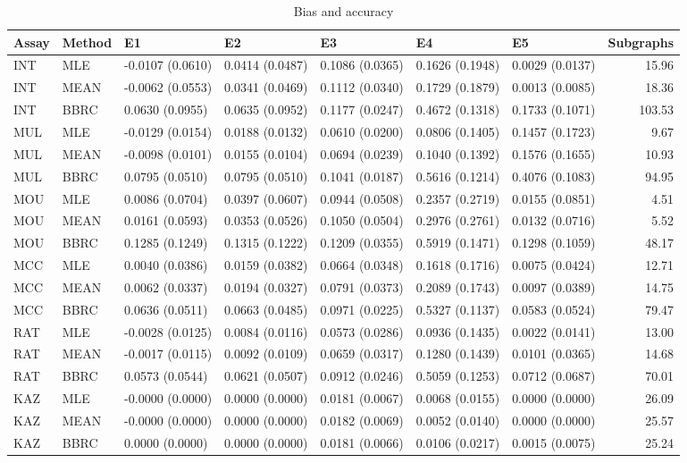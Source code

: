 \begin{table*}[t]
\begin{center}
  \begin{tabular}{lllllllr}
  \hline
 Assay & Method & E1 & E2 & E3 & E4 & E5 & Subgraphs \\ 
  \hline
  INT & MLE & -0.0107 (0.0610) & 0.0414 (0.0487) & 0.1086 (0.0365) & 0.1626 (0.1948) & 0.0029 (0.0137) & 15.96 \\ 
  INT & MEAN & -0.0062 (0.0553) & 0.0341 (0.0469) & 0.1112 (0.0340) & 0.1729 (0.1879) & 0.0013 (0.0085)& 18.36 \\ 
  INT & BBRC & 0.0630 (0.0955) & 0.0635 (0.0952) & 0.1177 (0.0247) & 0.4672 (0.1318) & 0.1733 (0.1071) & 103.53 \\ 
  MUL & MLE & -0.0129 (0.0154) & 0.0188 (0.0132) & 0.0610 (0.0200) & 0.0806 (0.1405) & 0.1457 (0.1723) & 9.67 \\ 
  MUL & MEAN & -0.0098 (0.0101) & 0.0155 (0.0104) & 0.0694 (0.0239) & 0.1040 (0.1392) & 0.1576 (0.1655)& 10.93 \\ 
  MUL & BBRC & 0.0795 (0.0510) & 0.0795 (0.0510) & 0.1041 (0.0187) & 0.5616 (0.1214) & 0.4076 (0.1083) & 94.95 \\ 
  MOU & MLE & 0.0086 (0.0704) & 0.0397 (0.0607) & 0.0944 (0.0508)  & 0.2357 (0.2719) & 0.0155 (0.0851) & 4.51 \\ 
  MOU & MEAN & 0.0161 (0.0593) & 0.0353 (0.0526) & 0.1050 (0.0504) & 0.2976 (0.2761) & 0.0132 (0.0716) & 5.52 \\ 
  MOU & BBRC & 0.1285 (0.1249) & 0.1315 (0.1222) & 0.1209 (0.0355) & 0.5919 (0.1471) & 0.1298 (0.1059) & 48.17 \\ 
  MCC & MLE & 0.0040 (0.0386) & 0.0159 (0.0382) & 0.0664 (0.0348)  & 0.1618 (0.1716) & 0.0075 (0.0424) & 12.71 \\ 
  MCC & MEAN & 0.0062 (0.0337) & 0.0194 (0.0327) & 0.0791 (0.0373) & 0.2089 (0.1743) & 0.0097 (0.0389) & 14.75 \\ 
  MCC & BBRC & 0.0636 (0.0511) & 0.0663 (0.0485) & 0.0971 (0.0225) & 0.5327 (0.1137) & 0.0583 (0.0524) & 79.47 \\ 
  RAT & MLE & -0.0028 (0.0125) & 0.0084 (0.0116) & 0.0573 (0.0286) & 0.0936 (0.1435) & 0.0022 (0.0141) & 13.00 \\ 
  RAT & MEAN & -0.0017 (0.0115) & 0.0092 (0.0109) & 0.0659 (0.0317) & 0.1280 (0.1439) & 0.0101 (0.0365)& 14.68 \\ 
  RAT & BBRC & 0.0573 (0.0544) & 0.0621 (0.0507) & 0.0912 (0.0246) & 0.5059 (0.1253) & 0.0712 (0.0687) & 70.01 \\ 
  KAZ & MLE & -0.0000 (0.0000) & 0.0000 (0.0000) & 0.0181 (0.0067) & 0.0068 (0.0155) & 0.0000 (0.0000) & 26.09 \\ 
  KAZ & MEAN & -0.0000 (0.0000) & 0.0000 (0.0000) & 0.0182 (0.0069) & 0.0052 (0.0140) & 0.0000 (0.0000)& 25.57 \\ 
  KAZ & BBRC & 0.0000 (0.0000) & 0.0000 (0.0000) & 0.0181 (0.0066) & 0.0106 (0.0217) & 0.0015 (0.0075) & 25.24 \\ 
   \hline
 \end{tabular}
\caption{Bias and accuracy}
\label{t:anal}
\end{center}
\end{table*}
